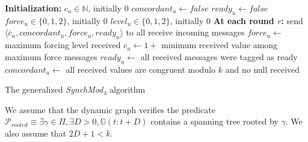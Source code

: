 \documentclass[11pt,letterpaper]{article}
\newcommand{\cent}{\gamma}
\newcommand{\SM}{{\em SynchMod}$_{\,k}\ $}
\begin{document}
\begin{algorithm}[htb]
	\DontPrintSemicolon
	\textbf{Initialization:} \;
	\Indp
		$c_u \in \mathds{N}$, initially 0 \;
		$concordant_u \leftarrow false$ \;
		$ready_u \leftarrow false$ \;
		$force_u \in \{0, 1, 2\}$, initially 0 \;
		$level_u \in \{0, 1, 2\}$, initially 0 \;
	\BlankLine
	\Indm
	\textbf{At each round $r$:} \;
	\Indp
		send $\langle \overline{c}_u, concordant_u, force_u, ready_u \rangle$ to all  \;
		receive incoming messages \;
		$force_u \leftarrow$ maximum forcing level received \;\label{line:force}
		$c_u \leftarrow 1+$ minimum received value among maximum force messages \;\label{line:min-z-end} 
		$ready_u \leftarrow$ all received messages were tagged as ready \; \label{line:ready-gossip} 
		$concordant_u \leftarrow$ all received values are congruent modulo $k$ and no null received \; \label{line:conc-gossip}
	\Indm
\caption{The generalized \SM algorithm} 
\end{algorithm}

We assume that the dynamic graph verifies the predicate $\mathcal{P}_{rooted} \equiv \exists \cent \in \Pi, \exists D > 0, \mathds{G}(t:t+D)$ contains a spanning tree rooted by $\cent$.
We also assume that $2D+1 < k$.
\end{document}
